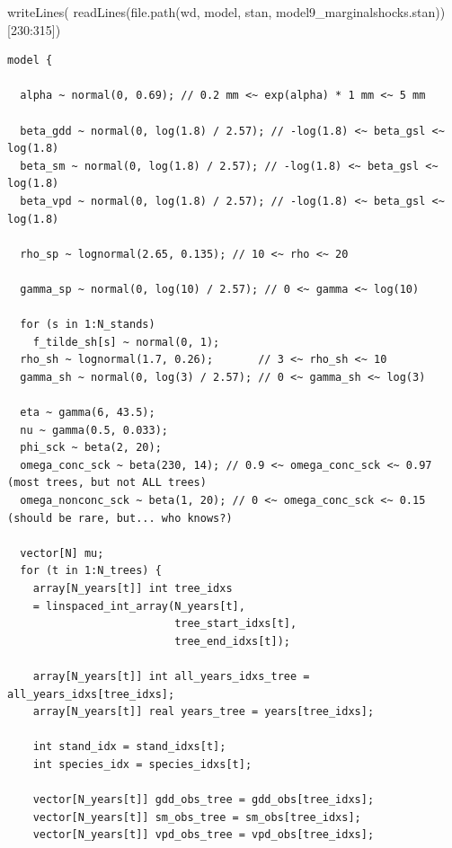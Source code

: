 \documentclass[
  letterpaper,
  DIV=11,
  numbers=noendperiod]{scrartcl}
\newenvironment{Shaded}{\begin{snugshade}}{\end{snugshade}}
\newcommand{\DecValTok}[1]{\textcolor[rgb]{0.68,0.00,0.00}{#1}}
\newcommand{\FunctionTok}[1]{\textcolor[rgb]{0.28,0.35,0.67}{#1}}
\newcommand{\NormalTok}[1]{\textcolor[rgb]{0.00,0.23,0.31}{#1}}
\newcommand{\SpecialCharTok}[1]{\textcolor[rgb]{0.37,0.37,0.37}{#1}}
\newcommand{\StringTok}[1]{\textcolor[rgb]{0.13,0.47,0.30}{#1}}
\begin{document}
\linespread{0.5}

\begin{Shaded}
\begin{Highlighting}[]
\FunctionTok{writeLines}\NormalTok{(}
  \FunctionTok{readLines}\NormalTok{(}\FunctionTok{file.path}\NormalTok{(wd, }\StringTok{\textquotesingle{}model\textquotesingle{}}\NormalTok{, }\StringTok{\textquotesingle{}stan\textquotesingle{}}\NormalTok{, }
                      \StringTok{\textquotesingle{}model9\_marginalshocks.stan\textquotesingle{}}\NormalTok{))[}\DecValTok{230}\SpecialCharTok{:}\DecValTok{315}\NormalTok{])}
\end{Highlighting}
\end{Shaded}

\begin{verbatim}
model {
  
  alpha ~ normal(0, 0.69); // 0.2 mm <~ exp(alpha) * 1 mm <~ 5 mm
  
  beta_gdd ~ normal(0, log(1.8) / 2.57); // -log(1.8) <~ beta_gsl <~ log(1.8)
  beta_sm ~ normal(0, log(1.8) / 2.57); // -log(1.8) <~ beta_gsl <~ log(1.8)
  beta_vpd ~ normal(0, log(1.8) / 2.57); // -log(1.8) <~ beta_gsl <~ log(1.8)
  
  rho_sp ~ lognormal(2.65, 0.135); // 10 <~ rho <~ 20
  
  gamma_sp ~ normal(0, log(10) / 2.57); // 0 <~ gamma <~ log(10)
  
  for (s in 1:N_stands)
    f_tilde_sh[s] ~ normal(0, 1);
  rho_sh ~ lognormal(1.7, 0.26);       // 3 <~ rho_sh <~ 10
  gamma_sh ~ normal(0, log(3) / 2.57); // 0 <~ gamma_sh <~ log(3)
  
  eta ~ gamma(6, 43.5);
  nu ~ gamma(0.5, 0.033); 
  phi_sck ~ beta(2, 20); 
  omega_conc_sck ~ beta(230, 14); // 0.9 <~ omega_conc_sck <~ 0.97 (most trees, but not ALL trees)
  omega_nonconc_sck ~ beta(1, 20); // 0 <~ omega_conc_sck <~ 0.15 (should be rare, but... who knows?)
  
  vector[N] mu;
  for (t in 1:N_trees) {
    array[N_years[t]] int tree_idxs
    = linspaced_int_array(N_years[t],
                          tree_start_idxs[t],
                          tree_end_idxs[t]);

    array[N_years[t]] int all_years_idxs_tree = all_years_idxs[tree_idxs];
    array[N_years[t]] real years_tree = years[tree_idxs];

    int stand_idx = stand_idxs[t];
    int species_idx = species_idxs[t];

    vector[N_years[t]] gdd_obs_tree = gdd_obs[tree_idxs];
    vector[N_years[t]] sm_obs_tree = sm_obs[tree_idxs];
    vector[N_years[t]] vpd_obs_tree = vpd_obs[tree_idxs];


\end{verbatim}
\end{document}
